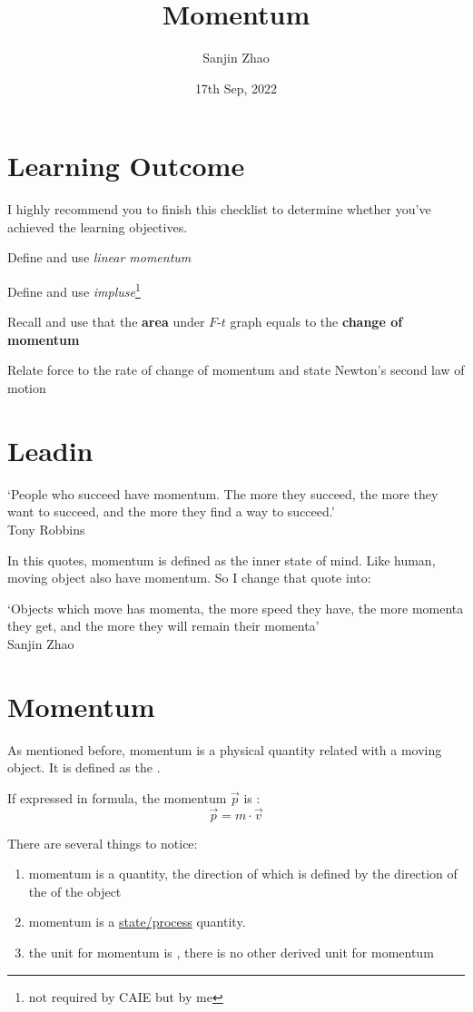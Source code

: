 \documentclass[a4paper]{tufte-handout}
\title{Momentum}
\author{Sanjin Zhao}
\date{17th Sep, 2022}  %
\newenvironment{SummBox}
{\begin{tcolorbox}[breakable,colback=r1!30,colframe=r1,title=Summary]} {\end{tcolorbox}}
\begin{document}
\maketitle%
\section*{Learning Outcome}
I highly recommend you to finish this checklist to determine whether you've achieved the learning objectives.
\begin{todolist}
  \item Define and use \emph{linear momentum}
  \item Define and use \emph{impluse}\footnote{not required by CAIE but by me}
  \item Recall and use that the \textbf{area} under $F$-$t$ graph equals to the \textbf{change of momentum}
  \item Relate force to the rate of change of momentum and state Newton’s second law of motion
\end{todolist}
\clearpage

\section{Leadin}
`People who succeed have momentum. The more they succeed, the more they want to succeed, and the more they find a way to succeed.' \\
\hfill{} Tony Robbins

In this quotes, momentum is defined as the inner state of mind. Like human, moving object also have momentum. So I change that quote into:

\noindent `Objects which move has momenta, the more speed they have, the more momenta they get, and the more they will remain their momenta' \\
\hfill{} Sanjin Zhao

\section{Momentum}
As mentioned before, momentum is a physical quantity related with a moving object. It is defined as the \uline{\hfill}.
\begin{SummBox}
If expressed in formula, the momentum $\vec{p}$ is :
\[
   \vec{p} = m \cdot \vec{v}
\] 
\end{SummBox}
There are several things to notice:
\begin{enumerate}
  \item momentum is a \uline{\hspace{1 in}} quantity, the direction of which is defined by the direction of the \uline{\hspace{1 in}} of the object
  \item momentum is a \uline{state/process} quantity.
  \item the unit for momentum is \uline{\hspace{2 in}}, there is no other derived unit for momentum
\end{enumerate}
\end{document}
